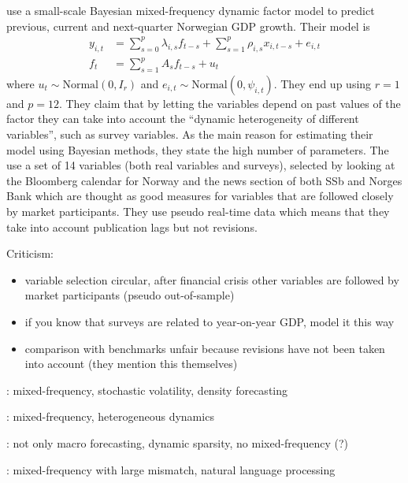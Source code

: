 \textbf{\citet{LucianiRicci2014}} use a small-scale Bayesian mixed-frequency dynamic factor model to predict previous, current and next-quarter Norwegian GDP growth. Their model is
\begin{align}
y_{i,t} &= \sum_{s=0}^p \lambda_{i,s} f_{t-s} + \sum_{s=1}^p \rho_{i,s} x_{i,t-s} + e_{i,t} \\
f_t &= \sum_{s=1}^p A_s f_{t-s} + u_t
\end{align}
where $u_t\sim \mathrm{Normal}(0, I_r)$ and $e_{i,t}\sim \mathrm{Normal}(0, \psi_{i,t})$. They end up using $r=1$ and $p=12$. They claim that by letting the variables depend on past values of the factor they can take into account the ``dynamic heterogeneity of different variables'', such as survey variables. As the main reason for estimating their model using Bayesian methods, they state the high number of parameters. The use a set of 14 variables (both real variables and surveys), selected by looking at the Bloomberg calendar for Norway and the news section of both SSb and Norges Bank which are thought as good measures for variables that are followed closely by market participants. They use pseudo real-time data which means that they take into account publication lags but not revisions. 

Criticism:
\begin{itemize}
	\item variable selection circular, after financial crisis other variables are followed by market participants (pseudo out-of-sample)
	\item if you know that surveys are related to year-on-year GDP, model it this way
	\item comparison with benchmarks unfair because revisions have not been taken into account (they mention this themselves)
\end{itemize}

\citet{MarcellinoEtal2016}: mixed-frequency, stochastic volatility, density forecasting

\citet{DAgostinoEtal2016}: mixed-frequency, heterogeneous dynamics



\citet{ZhouEtal2014}: not only macro forecasting, dynamic sparsity, no mixed-frequency (?)

\citet{Thorsrud2016a,Thorsrud2016b}: mixed-frequency with large mismatch, natural language processing

